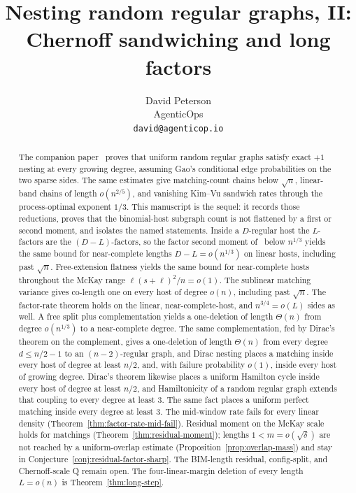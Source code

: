 \documentclass[11pt]{article}
\title{Nesting random regular graphs, II:\\
Chernoff sandwiching and long factors}
\author{David Peterson\\
AgenticOps\\
\texttt{david@agenticop.io}}
\date{}
\begin{document}
\maketitle

\begin{abstract}
The companion paper~\cite{PlusOneV1} proves that uniform random regular graphs
satisfy exact \(+1\) nesting at every growing degree, assuming Gao's conditional
edge probabilities on the two sparse sides.
The same estimates give matching-count chains below \(\sqrt{n}\), linear-band
chains of length \(o(n^{2/5})\), and vanishing Kim--Vu sandwich rates through
the process-optimal exponent \(1/3\).
This manuscript is the sequel: it records those reductions, proves that the
binomial-host subgraph count is not flattened by a first or second moment,
and isolates the named statements.
Inside a \(D\)-regular host the \(L\)-factors are the \((D-L)\)-factors, so the
factor second moment of~\cite{PlusOneV1} below \(n^{1/3}\) yields the same bound
for near-complete lengths \(D-L=o(n^{1/3})\) on linear hosts, including past
\(\sqrt{n}\).
Free-extension flatness yields the same bound for near-complete hosts
throughout the McKay range \(\ell(s+\ell)^2/n=o(1)\).
The sublinear matching variance gives co-length one on every host of degree
\(o(n)\), including past \(\sqrt{n}\).
The factor-rate theorem holds on the linear, near-complete-host, and
\(n^{3/4}=o(L)\) sides as well.
A free split plus complementation yields a one-deletion of length \(\Theta(n)\)
from degree \(o(n^{1/3})\) to a near-complete degree.
The same complementation, fed by Dirac's theorem on the complement,
gives a one-deletion of length \(\Theta(n)\) from every degree
\(d\le n/2-1\) to an \((n-2)\)-regular graph, and Dirac nesting places a
matching inside every host of degree at least \(n/2\), and, with failure
probability \(o(1)\), inside every host of growing degree.
Dirac's theorem likewise places a uniform Hamilton cycle inside every host of
degree at least \(n/2\), and Hamiltonicity of a random regular graph extends
that coupling to every degree at least \(3\). The same fact places a uniform
perfect matching inside every degree at least \(3\).
The mid-window rate fails for every linear density
(Theorem~\ref{thm:factor-rate-mid-fail}). Residual moment on the McKay scale
holds for matchings
(Theorem~\ref{thm:residual-moment}); lengths \(1<m=o(\sqrt\delta)\) are not
reached by a uniform-overlap estimate
(Proposition~\ref{prop:overlap-mass}) and stay in
Conjecture~\ref{conj:residual-factor-sharp}. The BIM-length residual,
config-split, and Chernoff-scale Q remain open. The four-linear-margin
deletion of every length \(L=o(n)\) is Theorem~\ref{thm:long-step}.
\end{abstract}
\end{document}
